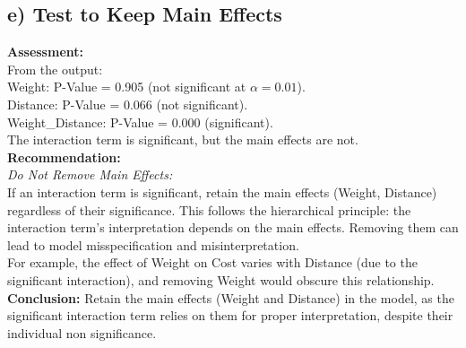 \documentclass{article}
\begin{document}
\subsection*{e) Test to Keep Main Effects}
\textbf{Assessment:} \\
From the output: \\
Weight: P-Value = 0.905 (not significant at \( \alpha = 0.01 \)). \\
Distance: P-Value = 0.066 (not significant). \\
Weight\_Distance: P-Value = 0.000 (significant). \\
The interaction term is significant, but the main effects are not. \\
\textbf{Recommendation:} \\
\textit{Do Not Remove Main Effects:} \\
If an interaction term is significant, retain the main effects (Weight, Distance) regardless of their significance. This follows the hierarchical principle: the interaction term’s interpretation depends on the main effects. Removing them can lead to model misspecification and misinterpretation. \\
For example, the effect of Weight on Cost varies with Distance (due to the significant interaction), and removing Weight would obscure this relationship. \\
\textbf{Conclusion:} Retain the main effects (Weight and Distance) in the model, as the significant interaction term relies on them for proper interpretation, despite their individual non significance.
\end{document}
